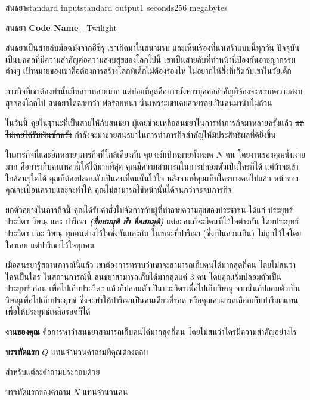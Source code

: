 \documentclass[11pt,a4paper]{article}
\begin{document}
\begin{problem}{สนธยา}{standard input}{standard output}{1 seconds}{256 megabytes}

สนธยา \textbf{Code Name} - Twilight

สนธยาเป็นสายลับมือฉมังจากฮิซิรุ เขาเกิดมาในสนามรบ และเห็นเรื่องที่น่าเศร้าแบบนี้ทุกวัน 
ปัจจุบันเป็นบุคคลที่มีความสำคัญต่อความสงบสุขของโลกไปนี้ เขาเป็นสายลับที่ทำหน้านี่ป้องกันอาชญากรรมต่างๆ
เป้าหมายของเขาคือต้องการสร้างโลกที่เด็กไม่ต้องร้องไห้ ไม่อยากให้สิ่งที่เกิดกับเขาในวัยเด็ก

ภารกิจที่เขาต้องทำนั้นมีหลากหลายมาก แต่บ่อยที่สุดคือการสังหารบุคคลสำคัญที่จ้องจะพรากความสงบสุขของโลกไป
สนธยาได้ฉายาว่า พ่อร้อยหน้า นั่นเพราะเขาเคยสวยรอยเป็นคนมานับไม่ถ้วน

ในวันนี้ คุยในฐานะที่เป็นสายให้กับสนธยา ผู้เคยช่วยเหลือสนธยาในการทำภารกิจมาหลายครั้งแล้ว
\st{แต่ไม่เคยได้รับเงินซักครั้ง} กำลังจะมาช่วยสนธยาในการทำภารกิจสำคัญให้มีประสิทธิผลที่ดียิ่งขึ้น

ในภารกิจนี้และอีกหลายๆภารกิจที่ใกล้เคียงกัน คุยจะมีเป้าหมายทั้งหมด $N$ คน โดยงานของคุณนั้นง่ายมาก
คือการเก็บคนเหล่านี้ให้ได้มากที่สุด คุณมีความสามารถในการปลอมตัวเป็นใครก็ได้ แต่ถ้าจะเข้าใกล้คนๆใดได้
คุณก็ต้องปลอมตัวเป็นคนที่คนนั้นไว้ใจ หลังจากที่คุณเก็บใครบางคนไปแล้ว หน้าของคุณจะเปื้อนคราบและจะทำให้
คุณไม่สามารถใช้หน้านั้นได้จนกว่าจะจบภารกิจ

ยกตัวอย่างในภารกิจนี้ คุณได้รับคำสั่งไปจัดการกับผู้ที่ทำลายความสุขของประชาชน ได้แก่
ประยุทธ์ ประวิตร วิษณุ และ ปารีณา \textbf{\textit{(ชื่อสมมุติ ย้ำ ชื่อสมมุติ)}}
แต่ละคนก็จะมีคนที่ไว้ใจต่างกัน โดยประยุทธ์ ประวิตร และ วิษณุ ทุกคนต่างไว้ใจซึ่งกันและกัน
ในขณะที่ปารีณา (ซึ่งเป็นส่วนเกิน) ไม่ถูกไว้ใจโดยใครเลย แต่ปารีณาไว้ใจทุกคน

เมื่อสนธยารู้สถานการณ์นี้แล้ว เขาต้องการทราบว่าเขาจะสามารถเก็บคนได้มากสุดกี่คน โดยไม่สนว่าใครเป็นใคร
ในสถานการณ์นี้ สนธยาสามารถเก็บได้มากสุดแค่ 3 คน โดยคุณเริ่มปลอมตัวเป็น ประยุทธ์ ก่อน
เพื่อไปเก็บประวิตร แล้วก็ปลอมตัวเป็นประวิตรเพื่อไปเก็บวิษณุ จากนั้นก็ปลอมตัวเป็นวิษณุเพื่อไปเก็บประยุทธ์
ซึ่งจะทำให้ปารีณาเป็นคนเดียวที่รอด หรือคุณสามารถเลือกเก็บปารีณาแทน เพื่อให้ประยุทธ์เหลือรอดก็ได้

\textbf{งานของคุณ} คือการหาว่าสนธยาสามารถเก็บคนได้มากสุดกี่คน โดยไม่สนว่าใครมีความสำคัญอย่างไร

\InputFile

\textbf{บรรทัดแรก} $Q$ แทนจำนวนคำถามที่คุณต้องตอบ

สำหรับแต่ละคำถามประกอบด้วย

บรรทัดแรกของคำถาม $N$ แทนจำนวนคน


\end{problem}
\end{document}
